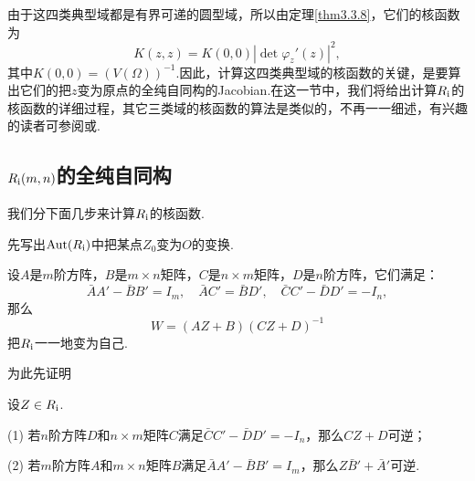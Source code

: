 由于这四类典型域都是有界可递的圆型域，所以由定理\ref{thm3.3.8}，它们的核函数为
\[K(z,z)=K(0,0)|\det\varphi_z'(z)|^2,\]
其中$K(0,0)=(V(\Omega))^{-1}$.因此，计算这四类典型域的核函数的关键，是要算出它们的把$z$变为原点的全纯自同构的Jacobian.在这一节中，我们将给出计算$R_{\text{\uppercase\expandafter{\romannumeral1}}}$的核函数的详细过程，其它三类域的核函数的算法是类似的，不再一一细述，有兴趣的读者可参阅\cite{华罗庚1958多复变数函数论中的典型域的调和分析}或\cite{陆启铿1956多复变数函数与酉几何}.
\subsection{$R_{\text{\uppercase\expandafter{\romannumeral1}}}(m,n)$的全纯自同构}
我们分下面几步来计算$R_{\text{\uppercase\expandafter{\romannumeral1}}}$的核函数.

先写出$\Aut(R_{\text{\uppercase\expandafter{\romannumeral1}}})$中把某点$Z_0$变为$O$的变换.
\begin{theorem}\label{thm3.4.2}
	设$A$是$m$阶方阵，$B$是$m\times n$矩阵，$C$是$n\times m$矩阵，$D$是$n$阶方阵，它们满足：
	\begin{equation}\label{eq3.4.1}
		\bar{A}A'-\bar{B}B'=I_m,\quad \bar{A}C'=\bar{B}D',\quad \bar{C}C'-\bar{D}D'=-I_n,
	\end{equation}
那么
\begin{equation}\label{eq3.4.2}
	W=(AZ+B)(CZ+D)^{-1}
\end{equation}
把$R_{\text{\uppercase\expandafter{\romannumeral1}}}$一一地变为自己.
\end{theorem}
为此先证明
\begin{lemma}\label{lem3.4.3}
	设$Z\in R_{\text{\uppercase\expandafter{\romannumeral1}}}$.
	
	(1)\hypertarget{3.4.3}{}
	若$n$阶方阵$D$和$n\times m$矩阵$C$满足$\bar{C}C'-\bar{D}D'=-I_n$，那么$CZ+D$可逆；
	
	(2)\hypertarget{3.4.3}{}
	若$m$阶方阵$A$和$m\times n$矩阵$B$满足$\bar{A}A'-\bar{B}B'=I_m$，那么$Z\bar{B}'+\bar{A}'$可逆.
\end{lemma}
